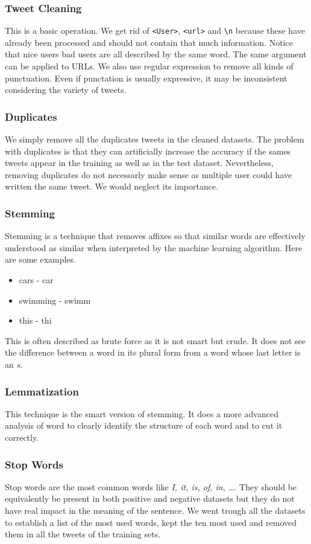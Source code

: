 \documentclass[11pt, a4paper, twocolumn]{article}
\begin{document}
\subsubsection{Tweet Cleaning}
This is a basic operation. We get rid of \texttt{<User>}, \texttt{<url>} and \verb"\n" because these have already been processed and should not contain that much information. Notice that nice users bad users are all described by the same word. The same argument can be applied to URLs. We also use regular expression to remove all kinds of punctuation. Even if punctation is usually expressive, it may be inconsistent considering the variety of tweets.
\subsubsection{Duplicates}
We simply remove all the duplicates tweets in the cleaned datasets. The problem with duplicates is that they can artificially increase the accuracy if the sames tweets appear in the training as well as in the test dataset. Nevertheless, removing duplicates do not necessarly make sense as multiple user could have written the same tweet. We would neglect its importance.
\subsubsection{Stemming}
Stemming is a technique  that removes affixes so that similar words are effectively understood as similar when interpreted by the machine learning algorithm. Here are some examples.
\begin{itemize}
	\item cars - car
	\item swimming - swimm
	\item this - thi
\end{itemize}
This is often described as brute force as it is not smart but crude. It does not see the difference between a word in its plural form from a word whose last letter is an \textit{s}.
\subsubsection{Lemmatization}
This technique is the smart version of stemming. It does a more advanced analysis of word to clearly identify the structure of each word and to cut it correctly.
\subsubsection{Stop Words}
Stop words are the most common words like \textit{I, it, is, of, in, \dots}. They should be equivalently be present in both positive and negative datasets but they do not have real impact in the meaning of the sentence. We went trough all the datasets to establish a list of the most used words, kept the ten most used and removed them in all the tweets of the training sets.
\end{document}
